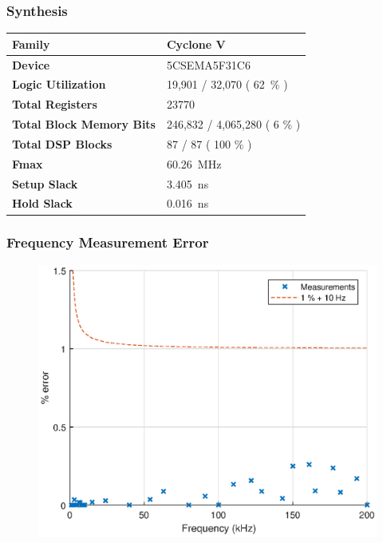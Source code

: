 \documentclass[pdf]{beamer}
\begin{document}
\begin{frame}
\frametitle{Synthesis}
\begin{table}[!htb]
  \centering
  \begin{tabular}[c]{ | l | l | }
    \hline
    \textbf{Family} & Cyclone V \\
    \hline
    \textbf{Device} & 5CSEMA5F31C6 \\
    \hline
    \textbf{Logic Utilization} & 19,901 / 32,070 ( 62~\% ) \\
    \hline
    \textbf{Total Registers} & 23770 \\
    \hline
    \textbf{Total Block Memory Bits} & 246,832 / 4,065,280 ( 6 \% ) \\
    \hline
    \textbf{Total DSP Blocks} & 87 / 87 ( 100 \% ) \\
    \hline
    \textbf{Fmax} & 60.26~MHz \\
    \hline
    \textbf{Setup Slack} & 3.405~ns \\
    \hline
    \textbf{Hold Slack} & 0.016~ns \\
    \hline
  \end{tabular}
\end{table}
\end{frame}

\begin{frame}
\frametitle{Frequency Measurement Error}
\begin{figure}[!htb]
  \includegraphics[height=0.8\textheight]{test-results/freq.eps}
\end{figure}
\end{frame}
\end{document}
